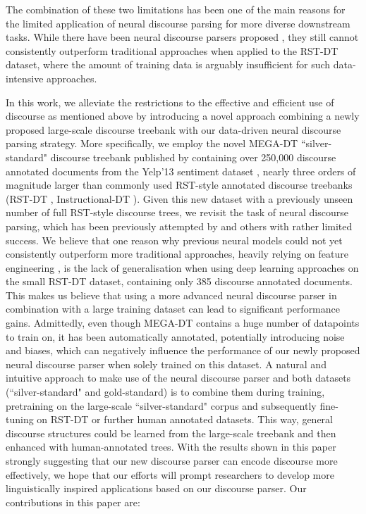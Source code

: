 \documentclass[11pt]{article}
\begin{document}
The combination of these two limitations has been one of the main reasons for the limited application of neural discourse parsing for more diverse downstream tasks. While there have been neural discourse parsers proposed \cite{braud-etal-2017-cross-lingual,yu2018transition,mabona-etal-2019-neural}, they still cannot consistently outperform traditional approaches when applied to the RST-DT dataset, where the amount of training data is arguably insufficient for such data-intensive approaches. 


In this work, we alleviate the restrictions to the effective and efficient use of discourse as mentioned above by introducing a novel approach combining a newly proposed large-scale discourse treebank with our data-driven neural discourse parsing strategy.
More specifically, we employ the novel MEGA-DT ``silver-standard" discourse treebank published by  containing over 250,000 discourse annotated documents from the Yelp'13 sentiment dataset \cite{tang2015document}, nearly three orders of magnitude larger than commonly used RST-style annotated discourse treebanks (RST-DT \cite{carlson2002rst}, Instructional-DT \cite{subba2009effective}). Given this new dataset with a previously unseen number of full RST-style discourse trees, we revisit the task of neural discourse parsing, which has been previously attempted by   and others with rather limited success. We believe that one reason why previous neural models could not yet consistently outperform more traditional approaches, heavily relying on feature engineering \cite{wang-etal-2017-two}, is the lack of generalisation when using deep learning approaches on the small RST-DT dataset, containing only 385 discourse annotated documents. This makes us believe that using a more advanced neural discourse parser in combination with a large training dataset can lead to significant performance gains. Admittedly, even though MEGA-DT contains a huge number of datapoints to train on, it has been automatically annotated, potentially introducing noise and biases, which can negatively influence the performance of our newly proposed neural discourse parser when solely trained on this dataset. A natural and intuitive approach to make use of the neural discourse parser and both datasets (``silver-standard" and gold-standard) is to combine them during training, pretraining on the large-scale ``silver-standard" corpus and subsequently fine-tuning on RST-DT or further human annotated datasets. This way, general discourse structures could be learned from the large-scale treebank and then enhanced with human-annotated trees. With the results shown in this paper strongly suggesting that our new discourse parser can encode discourse more effectively, we hope that our efforts will prompt researchers to develop more linguistically inspired applications based on our discourse parser. Our contributions in this paper are:
\end{document}
